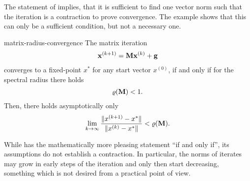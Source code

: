 \begin{remark}
  The statement of 
  implies, that it is sufficient to find one vector norm such that the
  iteration is a contraction to prove convergence. The example shows
  that this can only be a sufficient condition, but not a necessary
  one.
\end{remark}

\begin{Theorem}{matrix-radius-convergence}
  The matrix iteration
  \begin{gather}
    \mathbf x^{(k+1)} = \mathbf M \mathbf x^{(k)} + \mathbf g
  \end{gather}
  converges to a fixed-point $x^*$ for any start vector $x^{(0)}$,
  if and only if for the spectral radius there holds
  \begin{gather}
    \varrho(\mathbf M) < 1.
  \end{gather}
  Then, there holds asymptotically only
  \begin{gather}
    \lim_{k\to\infty} \frac{\lVert x^{(k+1)}-x^*\rVert}{\lVert x^{(k)}-x^*\rVert}
    < \varrho(\mathbf M).
  \end{gather}
\end{Theorem}

\begin{remark}
  While  has the
  mathematically more pleasing statement ``if and only if'', its
  assumptions do not establish a contraction. In particular, the norms
  of iterates may grow in early steps of the iteration and only then
  start decreasing, something which is not desired from a practical
  point of view.
\end{remark}

